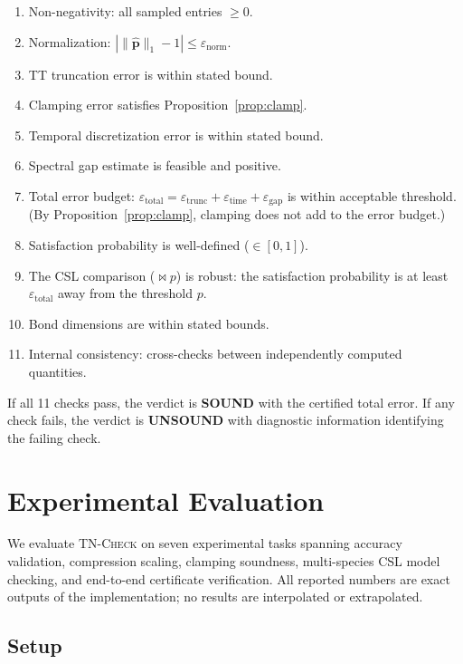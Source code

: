 \documentclass[11pt]{article}
\newcommand{\tncheck}{\textsc{TN-Check}}
\newcommand{\norm}[1]{\lVert #1 \rVert}
\newcommand{\eps}{\varepsilon}
\begin{document}
\begin{enumerate}[itemsep=1pt,label=C\arabic*.]
\item Non-negativity: all sampled entries $\geq 0$.
\item Normalization: $|\norm{\hat{\mathbf{p}}}_1 - 1| \leq \eps_{\mathrm{norm}}$.
\item TT truncation error is within stated bound.
\item Clamping error satisfies Proposition~\ref{prop:clamp}.
\item Temporal discretization error is within stated bound.
\item Spectral gap estimate is feasible and positive.
\item Total error budget: $\eps_{\mathrm{total}} = \eps_{\mathrm{trunc}} +
  \eps_{\mathrm{time}} + \eps_{\mathrm{gap}}$
  is within acceptable threshold.
  (By Proposition~\ref{prop:clamp}, clamping does not add to the
  error budget.)
\item Satisfaction probability is well-defined ($\in [0,1]$).
\item The CSL comparison ($\bowtie p$) is robust:
  the satisfaction probability is at least $\eps_{\mathrm{total}}$
  away from the threshold $p$.
\item Bond dimensions are within stated bounds.
\item Internal consistency: cross-checks between independently
  computed quantities.
\end{enumerate}

If all 11 checks pass, the verdict is \textbf{SOUND} with the
certified total error.
If any check fails, the verdict is \textbf{UNSOUND} with
diagnostic information identifying the failing check.

\section{Experimental Evaluation}\label{sec:experiments}

We evaluate \tncheck{} on seven experimental tasks spanning accuracy
validation, compression scaling, clamping soundness, multi-species
CSL model checking, and end-to-end certificate verification.
All reported numbers are exact outputs of the implementation;
no results are interpolated or extrapolated.

\subsection{Setup}\label{sec:exp:setup}
\end{document}
